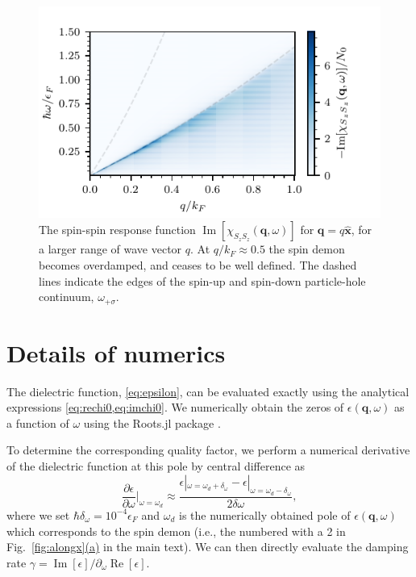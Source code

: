 \documentclass[aps,prb,reprint,twocolumns,superscriptaddress,nofootinbib]{revtex4-2}
\DeclareMathOperator{\Imm}{Im}
\DeclareMathOperator{\Ree}{Re}
\newcommand{\kF}{k_{F}}
\newcommand{\subfigref}[2]{Fig.~\hyperref[#1]{\ref*{#1}#2}}
\begin{document}
	\begin{figure}
		\includegraphics{SzSz_3D_large_range}
		\caption{The spin-spin response function $\Imm[\chi_{S_zS_z}(\bm q,\omega)]$ for $\bm q =q\hat{\bm x}$, for a larger range of wave vector $q$. At $q/\kF\approx 0.5$ the spin demon becomes overdamped, and ceases to be well defined. The dashed lines indicate the edges of the spin-up and spin-down particle-hole continuum, $\omega_{+\sigma}$. }
		\label{fig:larger-q}
	\end{figure}
	
	
	\section{Details of numerics}
	\label{sec:numerics}
	The dielectric function, \cref{eq:epsilon}, can be evaluated exactly using the analytical expressions \cref{eq:rechi0,eq:imchi0}. We  numerically obtain the zeros of $\epsilon(\bm q,\omega)$ as a function of $\omega$ using the Roots.jl package \cite{Roots.jl}.
	
	
	To determine the corresponding quality factor, we perform a numerical derivative of the dielectric function at this pole by central difference as
	\begin{equation}
		\frac{\partial\epsilon}{\partial\omega}\big|_{\omega=\omega_{d}} \approx \frac{\epsilon|_{\omega=\omega_{d}+\delta_\omega}-\epsilon|_{\omega=\omega_{d}-\delta_\omega}}{2\delta\omega},
	\end{equation}
	where we set $\hbar\delta_\omega=10^{-4}\epsilon_F$ and $\omega_d$ is the numerically obtained pole of $\epsilon(\bm q,\omega)$ which corresponds to the spin demon (i.e., the numbered with a 2 in \subfigref{fig:alongx}{(a)} in the main text). We can then directly evaluate the damping rate $\gamma=\Imm[\epsilon]/\partial_\omega\Ree[\epsilon]$.
	
\end{document}
